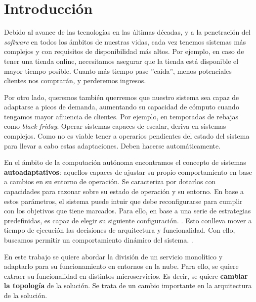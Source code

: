 
\chapter{Introducción}
\label{chap:introduccion}

Debido al avance de las tecnologías en las últimas décadas, y a la penetración del \emph{software} en todos los ámbitos de nuestras vidas, cada vez tenemos sistemas más complejos y con requisitos de disponibilidad más altos. Por ejemplo, en caso de tener una tienda online, necesitamos asegurar que la tienda está disponible el mayor tiempo posible. Cuanto más tiempo pase ''caída'', menos potenciales clientes nos comprarán, y perderemos ingresos.

Por otro lado, queremos también querremos que nuestro sistema sea capaz de adaptarse a picos de demanda, aumentando su capacidad de cómputo cuando tengamos mayor afluencia de clientes. Por ejemplo, en temporadas de rebajas como \emph{black friday}. Operar sistemas capaces de escalar, deriva en sistemas complejos. Como no es viable tener a operarios pendientes del estado del sistema para llevar a cabo estas adaptaciones. Deben hacerse automáticamente.

En el ámbito de la computación autónoma encontramos el concepto de sistemas \textbf{autoadaptativos}: aquellos capaces de ajustar su propio comportamiento en base a cambios en su entorno de operación. Se caracteriza por dotarlos con capacidades para razonar sobre su estado de operación y su entorno. En base a estos parámetros, el sistema puede intuir que debe reconfigurarse para cumplir con los objetivos que tiene marcados. Para ello, en base a una serie de estrategias predefinidas, es capaz de elegir su siguiente configuración. \cite{garlanIncreasingSystemDependability2003}. Esto conlleva mover a tiempo de ejecución las decisiones de arquitectura y funcionalidad. Con ello, buscamos permitir un comportamiento dinámico del sistema. \cite{brunEngineeringSelfAdaptiveSystems2009}.

En este trabajo se quiere abordar la división de un servicio monolítico y adaptarlo para su funcionamiento en entornos en la nube. Para ello, se quiere extraer su funcionalidad en distintos microservicios. Es decir, se quiere \textbf{cambiar la topología} de la solución. Se trata de un cambio importante en la arquitectura de la solución.

